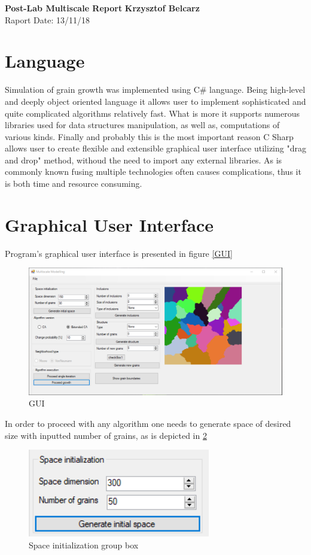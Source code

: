 \documentclass[a4paper, 11pt]{article}
\begin{document}
\noindent
\large\textbf{Post-Lab Multiscale Report} \hfill \textbf{Krzysztof Belcarz} \\
 \hfill Raport Date: 13/11/18 

\section*{Language}
Simulation of grain growth was implemented using C$\#$ language. Being high-level and deeply object oriented language it allows user to implement sophisticated and quite complicated algorithms relatively fast. What is more it supports numerous libraries used for data structures manipulation, as well as, computations of various kinds. Finally and probably this is the most important reason C Sharp allows user to create flexible and extensible graphical user interface utilizing "drag and drop" method, withoud the need to import any external libraries. As is commonly known 
fusing multiple technologies often causes complications, thus it is both time and resource consuming.
\section*{Graphical User Interface}
Program's graphical user interface is presented in figure \ref{GUI}
\begin{figure}[H]
\centering
  \includegraphics[width=\linewidth]{GUI}
  \caption{GUI}
  \label{GUI}
  \label{fig:boat1}
\end{figure}
In order to proceed with any algorithm one needs to generate space of desired size with inputted number of grains, as is depicted in \ref{SpaceInitLabel}
\begin{figure}[H]
\centering
  \includegraphics{SpaceInit}
  \caption{Space initialization group box}
  \label{SpaceInitLabel}
\end{figure}
\end{document}
